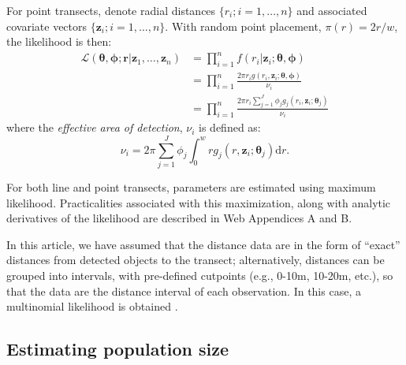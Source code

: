 \documentclass[useAMS,referee,usenatbib]{biom}
\begin{document}
For point transects, denote radial distances $\{r_i; i=1,\ldots,n\}$ and associated covariate vectors $\{\bm{z}_i; i=1,\ldots,n\}$. With random point placement, $\pi(r)=2r/w$, the likelihood is then:
\begin{align*}
\mathcal{L}(\bm{\theta},\bm{\phi}; \mathbf{r}  \vert \bm{z}_1, \ldots, \bm{z}_n) &= \prod_{i=1}^n f(r_i \vert \bm{z}_i; \bm{\theta},\bm{\phi})\\
&= \prod_{i=1}^n \frac{2 \pi r_i g(r_i,\bm{z}_i; \bm{\theta},\bm{\phi})}{\nu_i}\\
&= \prod_{i=1}^n \frac{2 \pi r_i \sum_{j=1}^J \phi_j g_j(r_i,\bm{z}_i; \bm{\theta}_j)}{\nu_i}
\end{align*}
where the \textit{effective area of detection}, $\nu_i$ is defined as:
\begin{equation*}
\nu_i = 2\pi \sum_{j=1}^J \phi_j \int_0^w  r g_j(r,\bm{z}_i; \bm{\theta}_j) \text{d}r.
\end{equation*}

For both line and point transects, parameters are estimated using maximum likelihood. Practicalities associated with this maximization, along with analytic derivatives of the likelihood are described in Web Appendices A and B.

In this article, we have assumed that the distance data are in the form of ``exact'' distances from detected objects to the transect; alternatively, distances can be grouped into intervals, with pre-defined cutpoints (e.g., 0-10m, 10-20m, etc.), so that the data are the distance interval of each observation.  In this case, a multinomial likelihood is obtained \citep[see, e.g.][Section 3.3.2]{Buckland:2001vm}.

\subsection{Estimating population size}
\label{s:popsize}
\end{document}
